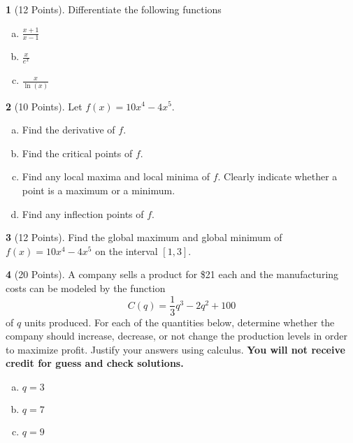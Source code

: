 \documentclass[12pt]{amsart}
\theoremstyle{definition}
\newtheorem{thm}{}
\theoremstyle{definition}
\begin{document}
\newpage

\begin{thm}[12 Points]
Differentiate the following functions
\begin{enumerate}[(a)]
\item
  $\displaystyle{\frac{x + 1}{x - 1}}$
  \vspace{2in}
\item
  $\displaystyle{\frac{x}{e^x}}$
  \vspace{2in}
\item
  $\displaystyle{\frac{x}{\ln(x)}}$
\end{enumerate}
\end{thm}
\newpage

\begin{thm}[10 Points]
  Let $f(x) = 10x^4 - 4x^5$.
  \begin{enumerate}[(a)]
  \item
    Find the derivative of $f$.
    \vspace{1in}
  \item
    Find the critical points of $f$.
    \vspace{2in}
  \item
    Find any local maxima and local minima of $f$.
    Clearly indicate whether a point is a maximum or a minimum.
    \vspace{2in}
  \item
    Find any inflection points of $f$.
  \end{enumerate}
\end{thm}

\newpage

\begin{thm}[12 Points]
  Find the global maximum and global minimum of $f(x) = 10x^4 - 4x^5$ on the interval $[1,3]$.
\end{thm}
\newpage
\begin{thm}[20 Points]
  A company sells a product for \$21 each and the manufacturing costs can be modeled by the function
  $$C(q) = \frac{1}{3}q^{3} - 2q^{2} + 100$$
  of $q$ units produced.
  For each of the quantities below, determine whether the company should increase, decrease, or not change the production levels in order to maximize profit.
  Justify your answers using calculus.
  {\bf You will not receive credit for guess and check solutions.}
  \begin{multicols}{3}
  \begin{enumerate}[(a)]
    \item
      $q = 3$
    \item
      $q = 7$
    \item
      $q = 9$
    \end{enumerate}
  \end{multicols}
\end{thm}
\end{document}
